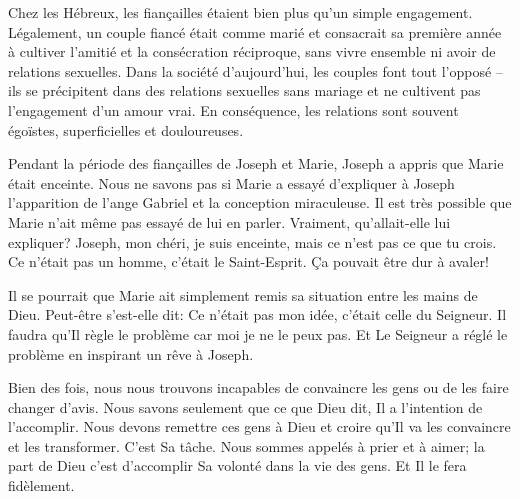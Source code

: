 


Chez les Hébreux, les fiançailles étaient bien plus qu'un simple engagement. Légalement, un couple fiancé était comme marié et consacrait sa première année à cultiver l'amitié et la consécration réciproque, sans vivre ensemble ni avoir de relations sexuelles. Dans la société d'aujourd'hui, les couples font tout l'opposé – ils se précipitent dans des relations sexuelles sans mariage et ne cultivent pas l'engagement d'un amour vrai. En conséquence, les relations sont souvent égoïstes, superficielles et douloureuses.

Pendant la période des fiançailles de Joseph et Marie, Joseph a appris que Marie était enceinte. Nous ne savons pas si Marie a essayé d'expliquer à Joseph l'apparition de l'ange Gabriel et la conception miraculeuse. Il est très possible que Marie n'ait même pas essayé de lui en parler. Vraiment, qu'allait-elle lui expliquer? \og Joseph, mon chéri, je suis enceinte, mais ce n'est pas ce que tu crois. Ce n'était pas un homme, c'était le Saint-Esprit. \fg{} Ça pouvait être dur à avaler!

Il se pourrait que Marie ait simplement remis sa situation entre les mains de Dieu. Peut-être s'est-elle dit: \og Ce n'était pas mon idée, c'était celle du Seigneur. Il faudra qu'Il règle le problème car moi je ne le peux pas. \fg{} Et Le Seigneur a réglé le problème en inspirant un rêve à Joseph.

Bien des fois, nous nous trouvons incapables de convaincre les gens ou de les faire changer d'avis. Nous savons seulement que ce que Dieu dit, Il a l'intention de l'accomplir. Nous devons remettre ces gens à Dieu et croire qu'Il va les convaincre et les transformer. C'est Sa tâche. Nous sommes appelés à prier et à aimer; la part de Dieu c'est d'accomplir Sa volonté dans la vie des gens. Et Il le fera fidèlement.




                      

